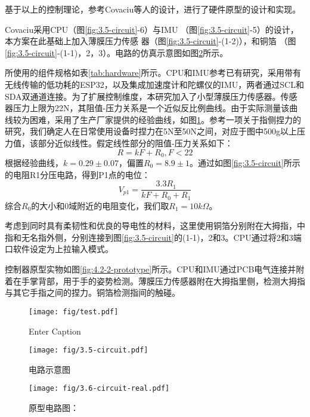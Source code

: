 基于以上的控制理论，参考Covaciu\cite{covaciu2022control}等人的设计，进行了硬件原型的设计和实现。

Covaciu\cite{covaciu2022control}采用CPU（图\ref{fig:3.5-circuit}-6）与IMU （图\ref{fig:3.5-circuit}-5）的设计，本方案在此基础上加入薄膜压力传感
器（图\ref{fig:3.5-circuit}-(1-2)），和铜箔 （图\ref{fig:3.5-circuit}-(1-1)，2，3）。电路的仿真示意图如图\ref{fig:4.2-1-circuit}所示。

所使用的组件规格如表\ref{tab:hardware}所示。CPU和IMU参考已有研究\cite{covaciu2022control}，采用带有无线传输的低功耗的ESP32，以及集成加速度计和陀螺仪的IMU，两者通过SCL和SDA双通道连接。为了扩展控制维度，本研究加入了小型薄膜压力传感器。传感器压力上限为22N，其阻值-压力关系是一个近似反比例曲线。由于实际测量该曲线较为困难，采用了生产厂家提供的经验曲线，如图\ref{fig:placeholder}。参考一项关于指侧捏力的研究\cite{呼慧敏2022中国成年人指侧捏力测量研究}，我们确定人在日常使用设备时捏力在5N至50N之间，对应于图中500g以上压力值，该部分近似线性。假定线性部分的阻值-压力关系如下：
$$
R = kF+R_0, F<22
$$
根据经验曲线，$k=0.29\pm 0.07$，偏置$R_0=8.9\pm1$。通过如图\ref{fig:3.5-circuit}所示的电阻R1分压电路，得到P1点的电位：
$$
V_{p1} = \frac{3.3R_1}{kF+R_0+R_1}
$$
综合$R_0$的大小和0域附近的电阻变化，我们取$R_1=10k\Omega$。

考虑到同时具有柔韧性和优良的导电性的材料，这里使用铜箔分别附在大拇指，中指和无名指外侧，分别连接到图\ref{fig:3.5-circuit}的(1-1)，2和3。CPU通过将2和3端口软件设定为上拉输入模式。

控制器原型实物如图\ref{fig:4.2-2-prototype}所示。CPU和IMU通过PCB电气连接并附着在手掌背部，用于手的姿势检测。薄膜压力传感器附在大拇指里侧，检测大拇指与其它手指之间的捏力。铜箔检测指间的触碰。

\begin{figure}
    \centering
    \texttt{[image: fig/test.pdf]}
    \caption{Enter Caption}
    \label{fig:placeholder}
\end{figure}

\begin{figure}
    \centering
    \texttt{[image: fig/3.5-circuit.pdf]}
    \caption{电路示意图}
    \label{fig:3.5-circuit}

    \vspace{-10pt}
    \texttt{[image:  fig/3.6-circuit-real.pdf]}
    \caption{原型电路图：}
    \label{fig:4.2-1-circuit}
    \vspace{-20pt}
\end{figure}

